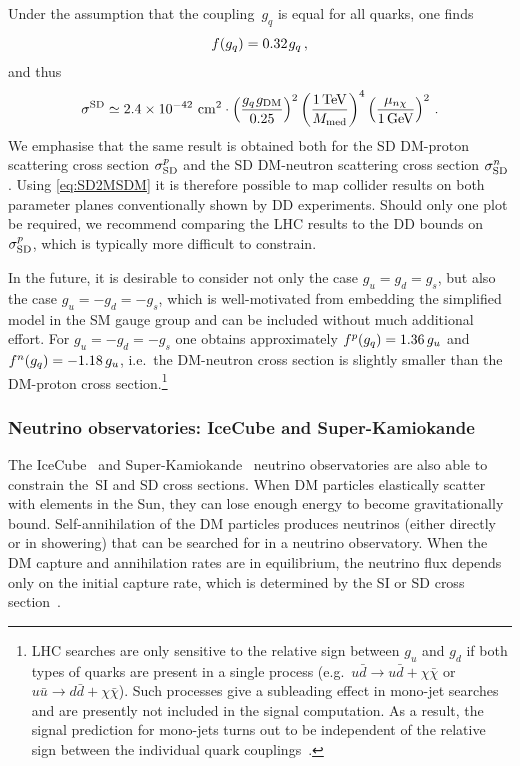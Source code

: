 Under the assumption that the coupling~$g_q$ is equal for all quarks, one finds 
\begin{equation}
f(g_q) = 0.32 \hspace{0.25mm} g_q \,,
\end{equation} 
and thus
\begin{align}
\label{eq:SD2MSDM}
 \sigma^{\rm{SD}} \simeq 2.4\times 10^{-42}~\mathrm{cm}^2\cdot\left(\frac{g_q \hspace{0.25mm} g_{\rm{DM}}}{0.25}\right)^2\left( \frac{1 \, \mathrm{TeV}}{M_{\rm{med}}}\right)^4\left(\frac{\mu_{n\chi}}{1 \, \mathrm{GeV}} \right)^2\,.
\end{align}
We emphasise that the same result is obtained both for the  SD DM-proton scattering  cross section $\sigma^p_{\rm{SD}}$ and the  SD DM-neutron scattering  cross section $\sigma^n_{\rm{SD}}$. Using \eqref{eq:SD2MSDM} it is therefore possible to map collider results on both parameter planes conventionally shown by  DD  experiments. Should only one plot be required, we recommend comparing  the LHC results to  the DD  bounds on $\sigma^p_{\rm{SD}}$, which is typically more difficult to constrain.

In the future, it is desirable to consider not only the case $g_u = g_d = g_s$, but also the case $g_u = -g_d = -g_s$, which is well-motivated from embedding the simplified model in the SM gauge group and can be included without much additional effort. For $g_u = -g_d = -g_s$ one obtains approximately $f^p(g_q) = 1.36 \, g_u$ and $f^n(g_q) = - 1.18 \, g_u$, i.e.\ the DM-neutron  cross section is slightly smaller than the DM-proton  cross section.\footnote{LHC searches are only sensitive to the relative sign between $g_u$ and $g_d$ if both types of quarks are present in a single process (e.g.~$u \bar{d} \rightarrow u \bar{d} + \chi \bar{\chi}$ or $u \bar{u} \rightarrow d \bar{d} + \chi \bar{\chi}$). Such processes give a  subleading effect in mono-jet searches and are presently not included in the signal computation. As a result, the signal prediction for mono-jets turns out to be independent of the relative sign between the individual quark couplings~\cite{Haisch:2016usn}.}

\subsubsection{Neutrino observatories: IceCube and Super-Kamiokande}

The IceCube~\cite{Aartsen:2016exj} and Super-Kamiokande~\cite{Choi:2015ara} neutrino observatories are also able to constrain the~SI and SD cross sections. When DM particles elastically scatter with elements in the Sun, they can lose enough energy to become gravitationally bound. Self-annihilation of the DM particles produces neutrinos (either directly or in showering) that can be searched for in a neutrino observatory. When the DM capture and annihilation rates are in equilibrium, the neutrino flux depends only on the initial capture rate, which is determined by the SI or SD cross section~\cite{Silk:1985ax}.  

